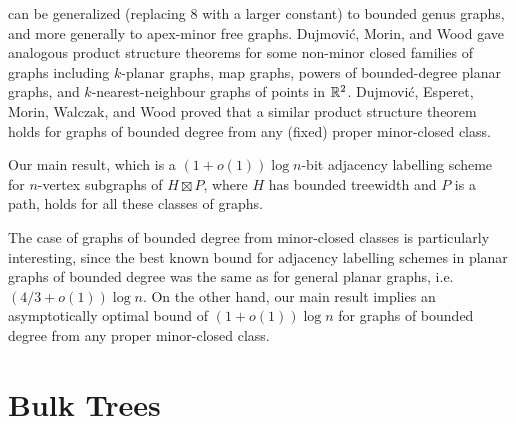 \documentclass[kpfonts]{patmorin}
\begin{document}
 can be generalized (replacing $8$ with a larger constant) to 
bounded genus graphs, and more generally to apex-minor free graphs.
Dujmović, Morin, and Wood \cite{dujmovic.morin.ea:structure} gave analogous product structure theorems for some non-minor closed families of graphs including $k$-planar graphs, map graphs, powers of bounded-degree planar graphs, and $k$-nearest-neighbour graphs of points in $\mathbb{R}^2$. Dujmović, Esperet, Morin, Walczak, and Wood \cite{DEMWW20} proved that a similar product structure theorem holds for graphs of bounded degree from any (fixed) proper minor-closed class.


Our main result, which is a $(1+o(1))\log n$-bit adjacency labelling scheme for $n$-vertex subgraphs of $H\boxtimes P$, where $H$ has bounded treewidth and $P$ is a path, holds for all these classes of graphs.

The case of graphs of bounded degree from minor-closed classes is particularly interesting, 
since the best known bound for adjacency labelling schemes in planar graphs of bounded degree was the same as for general planar graphs, i.e.\ $(4/3+o(1))\log n$. On the other hand, our main result implies an asymptotically optimal bound of $(1+o(1))\log n$ for graphs of bounded degree from any proper minor-closed class.


\section{Bulk Trees}
\end{document}
